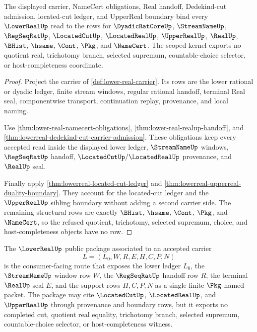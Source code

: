 \begin{theorem}
\label{thm:lowerreal-scoped-kernel-obligation}
The displayed carrier, NameCert obligations, Real handoff, Dedekind-cut admission, located-cut ledger, and UpperReal boundary bind every $\LowerRealUp$ read to the rows for $\DyadicRatCoreUp$, $\StreamNameUp$, $\RegSeqRatUp$, $\LocatedCutUp$, $\LocatedRealUp$, $\UpperRealUp$, $\RealUp$, $\BHist$, $\hsame$, $\Cont$, $\Pkg$, and $\NameCert$. The scoped kernel exports no quotient real, trichotomy branch, selected supremum, countable-choice selector, or host-completeness coordinate.
\end{theorem}
\begin{proof}
Project the carrier of \autoref{def:lower-real-carrier}. Its rows are the lower rational or dyadic ledger, finite stream windows, regular rational handoff, terminal Real seal, componentwise transport, continuation replay, provenance, and local naming.

Use \autoref{thm:lower-real-namecert-obligations}, \autoref{thm:lower-real-realup-handoff}, and \autoref{thm:lowerreal-dedekind-cut-carrier-admission}. These obligations keep every accepted read inside the displayed lower ledger, $\StreamNameUp$ windows, $\RegSeqRatUp$ handoff, $\LocatedCutUp/\LocatedRealUp$ provenance, and $\RealUp$ seal.

Finally apply \autoref{thm:lowerreal-located-cut-ledger} and \autoref{thm:lowerreal-upperreal-duality-boundary}. They account for the located-cut ledger and the $\UpperRealUp$ sibling boundary without adding a second carrier side. The remaining structural rows are exactly $\BHist$, $\hsame$, $\Cont$, $\Pkg$, and $\NameCert$, so the refused quotient, trichotomy, selected supremum, choice, and host-completeness objects have no row.
\end{proof}

\begin{definition}
\label{def:lowerreal-public-package}
The $\LowerRealUp$ public package associated to an accepted carrier
$$
L=(L_0,W,R,E,H,C,P,N)
$$
is the consumer-facing route that exposes the lower ledger $L_0$, the $\StreamNameUp$ window row $W$, the $\RegSeqRatUp$ handoff row $R$, the terminal $\RealUp$ seal $E$, and the support rows $H,C,P,N$ as a single finite $\Pkg$-named packet. The package may cite $\LocatedCutUp$, $\LocatedRealUp$, and $\UpperRealUp$ through provenance and boundary rows, but it exports no completed cut, quotient real equality, trichotomy branch, selected supremum, countable-choice selector, or host-completeness witness.
\end{definition}


